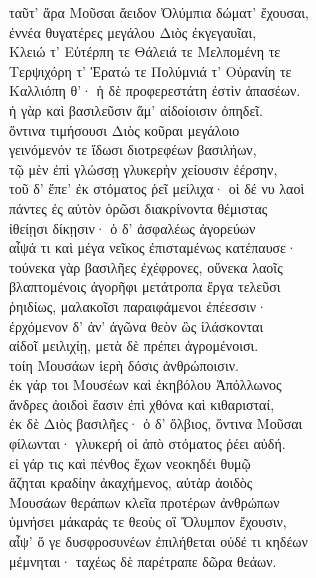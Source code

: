 \begin{pages}
\begin{Leftside}
\quad{}ταῦτ' ἄρα Μοῦσαι ἄειδον Ὀλύμπια δώματ' ἔχουσαι, \\
ἐννέα θυγατέρες μεγάλου Διὸς ἐκγεγαυῖαι,\\
Κλειώ τ' Εὐτέρπη τε Θάλειά τε Μελπομένη τε\\
Τερψιχόρη τ' Ἐρατώ τε Πολύμνιά τ' Οὐρανίη τε\\
Καλλιόπη θ'· ἡ δὲ προφερεστάτη ἐστὶν ἁπασέων. \\
ἡ γὰρ καὶ βασιλεῦσιν ἅμ' αἰδοίοισιν ὀπηδεῖ.  \\
ὅντινα τιμήσουσι Διὸς κοῦραι μεγάλοιο\\
γεινόμενόν τε ἴδωσι διοτρεφέων βασιλήων,\\
τῷ μὲν ἐπὶ γλώσσῃ γλυκερὴν χείουσιν ἐέρσην,\\
τοῦ δ' ἔπε' ἐκ στόματος ῥεῖ μείλιχα· οἱ δέ νυ λαοὶ \\
πάντες ἐς αὐτὸν ὁρῶσι διακρίνοντα θέμιστας \\
ἰθείῃσι δίκῃσιν· ὁ δ' ἀσφαλέως ἀγορεύων\\
αἶψά τι καὶ μέγα νεῖκος ἐπισταμένως κατέπαυσε· \\
τούνεκα γὰρ βασιλῆες ἐχέφρονες, οὕνεκα λαοῖς \\
βλαπτομένοις ἀγορῆφι μετάτροπα ἔργα τελεῦσι\\
ῥηιδίως, μαλακοῖσι παραιφάμενοι ἐπέεσσιν·  \\
ἐρχόμενον δ' ἀν' ἀγῶνα θεὸν ὣς ἱλάσκονται\\
αἰδοῖ μειλιχίῃ, μετὰ δὲ πρέπει ἀγρομένοισι. \\

\quad{}τοίη Μουσάων ἱερὴ δόσις ἀνθρώποισιν.\\
ἐκ γάρ τοι Μουσέων καὶ ἑκηβόλου Ἀπόλλωνος\\
ἄνδρες ἀοιδοὶ ἔασιν ἐπὶ χθόνα καὶ κιθαρισταί, \\
ἐκ δὲ Διὸς βασιλῆες· ὁ δ' ὄλβιος, ὅντινα Μοῦσαι\\
φίλωνται· γλυκερή οἱ ἀπὸ στόματος ῥέει αὐδή. \\
εἰ γάρ τις καὶ πένθος ἔχων νεοκηδέι θυμῷ\\
ἄζηται κραδίην ἀκαχήμενος, αὐτὰρ ἀοιδὸς\\
Μουσάων θεράπων κλεῖα προτέρων ἀνθρώπων  \\
ὑμνήσει μάκαράς τε θεοὺς οἳ Ὄλυμπον ἔχουσιν, \\
αἶψ' ὅ γε δυσφροσυνέων ἐπιλήθεται οὐδέ τι κηδέων\\
μέμνηται· ταχέως δὲ παρέτραπε δῶρα θεάων. \\


\end{Leftside}
\end{pages}
